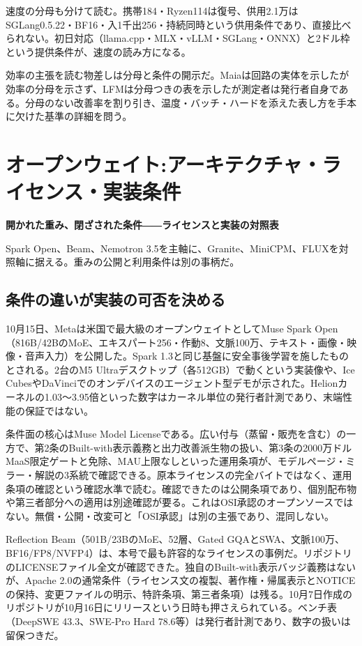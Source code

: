 \documentclass[lualatex,a4paper,10pt]{jlreq}
\begin{document}
速度の分母も分けて読む。携帯184・Ryzen114は復号、供用2.1万はSGLang0.5.22・BF16・入1千出256・持続同時という供用条件であり、直接比べられない。初日対応（llama.cpp・MLX・vLLM・SGLang・ONNX）と2ドル枠という提供条件が、速度の読み方になる。
\cite{B11,B69,B12}


効率の主張を読む物差しは分母と条件の開示だ。Maiaは回路の実体を示したが効率の分母を示さず、LFMは分母つきの表を示したが測定者は発行者自身である。分母のない改善率を割り引き、温度・バッチ・ハードを添えた表し方を手本に欠けた基準の詳細を問う。
\cite{B09,B66,B10,B67,B68,B11,B69,B12}


\section{オープンウェイト:アーキテクチャ・ライセンス・実装条件}
\label{sec:P3}

{\Large\bfseries 開かれた重み、閉ざされた条件――ライセンスと実装の対照表\par}
\smallskip
{\color{SurveyMuted}Spark Open、Beam、Nemotron 3.5を主軸に、Granite、MiniCPM、FLUXを対照軸に据える。重みの公開と利用条件は別の事柄だ。\par}
\bigskip

\subsection*{条件の違いが実装の可否を決める}

10月15日、Metaは米国で最大級のオープンウェイトとしてMuse Spark Open（816B/42BのMoE、エキスパート256・作動8、文脈100万、テキスト・画像・映像・音声入力）を公開した。Spark 1.3と同じ基盤に安全事後学習を施したものとされる。2台のM5 Ultraデスクトップ（各512GB）で動くという実装像や、Ice CubesやDaVinciでのオンデバイスのエージェント型デモが示された。Helionカーネルの1.03〜3.95倍といった数字はカーネル単位の発行者計測であり、末端性能の保証ではない。
\cite{B14,B70,B15,B13,B71}


条件面の核心はMuse Model Licenseである。広い付与（蒸留・販売を含む）の一方で、第2条のBuilt-with表示義務と出力改善派生物の扱い、第3条の2000万ドルMaaS限定ゲートと免除、MAU上限なしといった運用条項が、モデルページ・ミラー・解説の3系統で確認できる。原本ライセンスの完全バイトではなく、運用条項の確認という確認水準で読む。確認できたのは公開条項であり、個別配布物や第三者部分への適用は別途確認が要る。これはOSI承認のオープンソースではない。無償・公開・改変可と「OSI承認」は別の主張であり、混同しない。
\cite{B14,B70,B15,B13,B71}


Reflection Beam（501B/23BのMoE、52層、Gated GQAとSWA、文脈100万、BF16/FP8/NVFP4）は、本号で最も許容的なライセンスの事例だ。リポジトリのLICENSEファイル全文が確認できた。独自のBuilt-with表示バッジ義務はないが、Apache 2.0の通常条件（ライセンス文の複製、著作権・帰属表示とNOTICEの保持、変更ファイルの明示、特許条項、第三者条項）は残る。10月7日作成のリポジトリが10月16日にリリースという日時も押さえられている。ベンチ表（DeepSWE 43.3、SWE-Pro Hard 78.6等）は発行者計測であり、数字の扱いは留保つきだ。
\cite{B17,B19,B18,B16}
\end{document}
